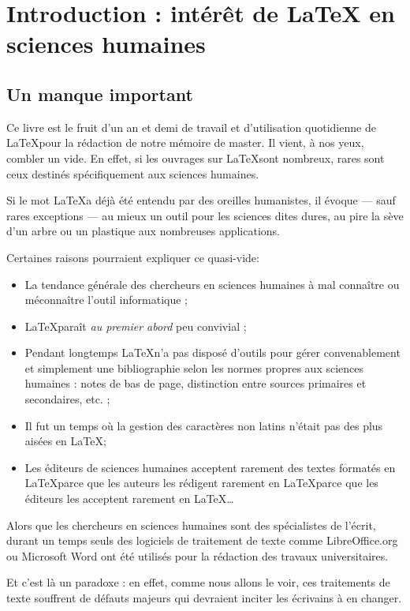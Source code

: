 \chapter[Introduction]{Introduction : intérêt de \LaTeX{} en sciences humaines}

\section{Un manque important}

Ce livre est le fruit d'un an et demi de travail et d'utilisation quotidienne de \LaTeX pour la rédaction de notre mémoire de master. Il vient, à nos yeux,  combler un vide. En effet, si les ouvrages sur \LaTeX sont nombreux, rares sont ceux destinés  spécifiquement aux sciences humaines. 

Si le mot \LaTeX a déjà été entendu par des oreilles humanistes, il évoque --- sauf rares exceptions --- au mieux un outil pour les sciences dites dures, au pire la sève d'un arbre ou un plastique aux nombreuses applications. 

Certaines raisons pourraient expliquer ce quasi-vide:
\begin{itemize}
\item La tendance générale des chercheurs en sciences humaines à mal connaître ou méconnaître l'outil informatique ;
\item \LaTeX paraît \emph{au premier abord} peu convivial ;
\item Pendant longtemps \LaTeX n'a pas disposé d'outils pour gérer convenablement et simplement une bibliographie selon les normes propres aux sciences humaines : notes de bas de page, distinction entre sources primaires et secondaires, etc. ;
\item Il fut un temps où la gestion des caractères non latins n'était pas des plus aisées en \LaTeX ;
\item Les éditeurs de sciences humaines acceptent rarement des textes formatés en \LaTeX parce que les auteurs les rédigent rarement en \LaTeX parce que les éditeurs les acceptent rarement en \LaTeX\ldots
\end{itemize}

Alors que les chercheurs en sciences humaines sont des spécialistes de l'écrit, durant un temps seuls des logiciels de traitement de texte comme LibreOffice.org ou Microsoft Word ont été utilisés pour la rédaction des travaux universitaires.

Et c'est là un paradoxe : en effet, comme nous allons le voir, ces traitements de texte souffrent de défauts majeurs qui devraient inciter les écrivains à en changer. 

